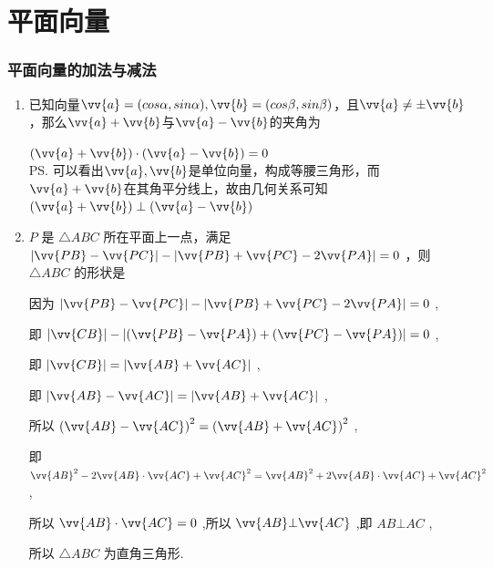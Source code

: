 \chapter*{平面向量}
\subsection*{平面向量的加法与减法}
\begin{enumerate}
    \item 已知向量$\vv{a} = (cos\alpha, sin\alpha), \vv{b} = (cos\beta, sin\beta)$，且$\vv{a} \neq \pm \vv{b}$，那么$\vv{a} + \vv{b}$与$\vv{a} - \vv{b}$的夹角为
    \begin{jieda}
        $(\vv{a} + \vv{b}) \cdot (\vv{a} - \vv{b}) = 0$ \\
        \ps 可以看出$\vv{a}, \vv{b}$是单位向量，构成等腰三角形，而$\vv{a} + \vv{b}$在其角平分线上，故由几何关系可知$(\vv{a} + \vv{b}) \perp (\vv{a} - \vv{b})$
    \end{jieda}
    \item $P$ 是 $\bigtriangleup  {ABC}$ 所在平面上一点，满足 $\left| {\vv{PB} - \vv{PC}}\right|  - \left| {\vv{PB} + \vv{PC} - 2\vv{PA}}\right|  = 0$ ，则 $\bigtriangleup  {ABC}$ 的形状是
    \begin{jieda}
        因为 $\left| {\vv{PB} - \vv{PC}}\right|  - \left| {\vv{PB} + \vv{PC} - 2\vv{PA}}\right|  = 0$ ,
        
        即 $\left| \vv{CB}\right|  - \left| {\left( {\vv{PB} - \vv{PA}}\right)  + \left( {\vv{PC} - \vv{PA}}\right) }\right|  = 0$ ,
        
        即 $\left| \vv{CB}\right|  = \left| {\vv{AB} + \vv{AC}}\right|$ ,
        
        即 $\left| {\vv{AB} - \vv{AC}}\right|  = \left| {\vv{AB} + \vv{AC}}\right|$ ,
        
        所以 ${\left( \vv{AB} - \vv{AC}\right) }^{2} = {\left( \vv{AB} + \vv{AC}\right) }^{2}$ ,
        
        即 ${\vv{AB}}^{2} - 2\vv{AB} \cdot  \vv{AC} + {\vv{AC}}^{2} = {\vv{AB}}^{2} + 2\vv{AB} \cdot  \vv{AC} + {\vv{AC}}^{2}$ ,
        
        所以 $\vv{AB} \cdot  \vv{AC} = 0$ ,所以 $\vv{AB} \bot  \vv{AC}$ ,即 ${AB} \bot  {AC}$ ,
        
        所以 $\bigtriangleup  {ABC}$ 为直角三角形.
    \end{jieda}
\end{enumerate}
